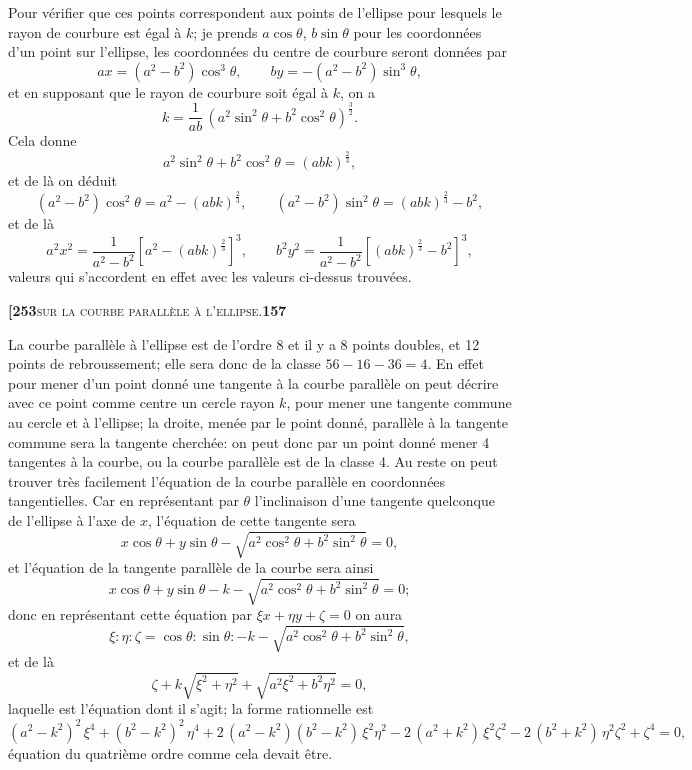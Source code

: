 \documentclass[11pt]{article}
\begin{document}
Pour vérifier que ces points correspondent aux points de l'ellipse pour lesquels le rayon de courbure est égal à $k$; je prends $a\cos\theta$, $b\sin\theta$ pour les coordonnées d'un point sur l'ellipse, les coordonnées du centre de courbure seront données par
\[
ax = (a^2 - b^2)\cos^3\theta,\qquad by = -(a^2 - b^2)\sin^3\theta,
\]
et en supposant que le rayon de courbure soit égal à $k$, on a
\[
k = \frac{1}{ab}\,(a^2\sin^2\theta + b^2\cos^2\theta)^{\frac{3}{2}}.
\]
Cela donne
\[
a^2\sin^2\theta + b^2\cos^2\theta = (abk)^{\frac{2}{3}},
\]
et de là on déduit
\[
(a^2 - b^2)\cos^2\theta = a^2 - (abk)^{\frac{2}{3}},\qquad (a^2 - b^2)\sin^2\theta = (abk)^{\frac{2}{3}} - b^2,
\]
et de là
\[
a^2x^2 = \frac{1}{a^2 - b^2}\left[a^2 - (abk)^{\frac{2}{3}}\right]^3,\qquad b^2y^2 = \frac{1}{a^2 - b^2}\left[(abk)^{\frac{2}{3}} - b^2\right]^3,
\]
valeurs qui s'accordent en effet avec les valeurs ci-dessus trouvées.

\newpage

\noindent\textbf{[253}\hfill\textsc{sur la courbe parallèle à l'ellipse.}\hfill\textbf{157}

\medskip

\noindent La courbe parallèle à l'ellipse est de l'ordre 8 et il y a 8 points doubles, et 12 points de rebroussement; elle sera donc de la classe $56 - 16 - 36 = 4$. En effet pour mener d'un point donné une tangente à la courbe parallèle on peut décrire avec ce point comme centre un cercle rayon $k$, pour mener une tangente commune au cercle et à l'ellipse; la droite, menée par le point donné, parallèle à la tangente commune sera la tangente cherchée: on peut donc par un point donné mener 4 tangentes à la courbe, ou la courbe parallèle est de la classe 4. Au reste on peut trouver très facilement l'équation de la courbe parallèle en coordonnées tangentielles. Car en représentant par $\theta$ l'inclinaison d'une tangente quelconque de l'ellipse à l'axe de $x$, l'équation de cette tangente sera
\[
x\cos\theta + y\sin\theta - \sqrt{a^2\cos^2\theta + b^2\sin^2\theta} = 0,
\]
et l'équation de la tangente parallèle de la courbe sera ainsi
\[
x\cos\theta + y\sin\theta - k - \sqrt{a^2\cos^2\theta + b^2\sin^2\theta} = 0;
\]
donc en représentant cette équation par $\xi x + \eta y + \zeta = 0$ on aura
\[
\xi : \eta : \zeta = \cos\theta : \sin\theta : -k - \sqrt{a^2\cos^2\theta + b^2\sin^2\theta},
\]
et de là
\[
\zeta + k\sqrt{\xi^2 + \eta^2} + \sqrt{a^2\xi^2 + b^2\eta^2} = 0,
\]
laquelle est l'équation dont il s'agit; la forme rationnelle est
\[
(a^2 - k^2)^2\,\xi^4 + (b^2 - k^2)^2\,\eta^4 + 2\,(a^2 - k^2)(b^2 - k^2)\,\xi^2\eta^2 - 2\,(a^2 + k^2)\,\xi^2\zeta^2 - 2\,(b^2 + k^2)\,\eta^2\zeta^2 + \zeta^4 = 0,
\]
équation du quatrième ordre comme cela devait être.
\end{document}
